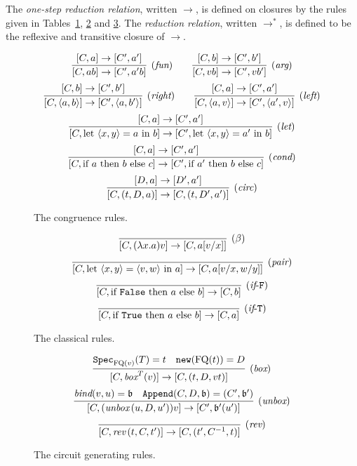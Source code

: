 \documentclass[twoside]{article}
\begin{document}
\begin{definition}
The \emph{one-step reduction relation}, written $\to$, is defined 
on closures by the rules given in Tables~\hyperref[cong_rules]{\ref*{cong_rules}}, 
\hyperref[classical_rules]{\ref*{classical_rules}} 
and \hyperref[circ_gen_rules]{\ref*{circ_gen_rules}}. 
The \emph{reduction relation}, 
written $\to^*$, is defined to be the reflexive and transitive closure of $\to$.
\end{definition}

\begin{figure}[p]
\begin{mdframed}
\[
  \infer[(\rul{fun})]{[C,ab]\to[C',a'b]}{
    [C,a]\to[C',a']
  }
~~~~~~
  \infer[(\rul{arg})]{[C,vb]\to [C',vb']}{
    [C,b]\to [C',b']
  }
\]
\[
  \infer[(\rul{right})]{[C,\langle a,b\rangle]\to [C',\langle a,b'\rangle]}{
    [C,b]\to [C',b']
  }
~~~~~~
  \infer[(\rul{left})]{[C,\langle a,v\rangle]\to [C',\langle a',v\rangle]}{
    [C,a]\to [C',a']
  }
\]
\[
  \infer[(\rul{let})]{[C,\letin{\p{x,y}}{a}{b}]\to 
                [C', \letin{\p{x,y}}{a'}{b}]}{
    [C,a]\to [C',a']
  }
\]
\[
  \infer[(\rul{cond})]{[C, \ifthenelse{a}{b}{c}]\to [C', \ifthenelse{a'}{b}{c}]}{
    [C,a]\to [C',a']
  }
\]
\[
  \infer[(\rul{circ})]{[C, (t,D,a)]\to [C, (t,D',a')]}{
    [D,a]\to [D',a']
  }
\]
\end{mdframed}
\caption{The congruence rules.}
\label{cong_rules}
\end{figure}

\begin{figure}[p]
\begin{mdframed}
\[
  \infer[(\beta)]{[C,(\lambda x.a)v]\to [C, a[v/x]]}{}
\]
\[
  \infer[(\rul{pair})]{[C,\letin{\p{x,y}}{\p{v,w}}{a}]\to[C,a[v/x,w/y]]}{}
\]
\[
  \infer[(\rul{if}\mbox{-}\mathtt{F})]{[C,\ifthenelse{\mathtt{False}}{a}{b}] \to [C, b]}{}
\]
\[
  \infer[(\rul{if}\mbox{-}\mathtt{T})]{[C,\ifthenelse{\mathtt{True}}{a}{b}] \to [C, a]}{}
\]
\end{mdframed}
\caption{The classical rules.}
\label{classical_rules}
\end{figure}

\begin{figure}[p]
\begin{mdframed}
\[
  \infer[(\boxx)]{[C,\boxx^T(v)]\to [C,(t,D,vt)]}{
    \spec_{\FQ(v)}(T)=t
    &
    \mathtt{new}(\FQ(t))=D
  }
\]
\[
  \infer[(\unbox)]{[C,(\unbox\,(u,D,u'))v]\to [C',\binding'(u')]}{
    \bind(v,u)=\binding 
    &
    \mathtt{Append}(C,D,\binding) = (C',\binding') 
  }
\]
\[
  \infer[(\rev)]{[C,\rev\,(t,C,t')]\to [C,(t',C^{-1},t)]}{}
\]
\end{mdframed}
\caption{The circuit generating rules.}
\label{circ_gen_rules}
\end{figure}
\end{document}
